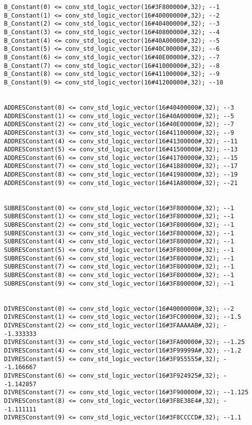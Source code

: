\documentclass[conference]{IEEEtran}
\begin{document}
\begin{lstlisting}
B_Constant(0) <= conv_std_logic_vector(16#3F800000#,32); --1
B_Constant(1) <= conv_std_logic_vector(16#40000000#,32); --2
B_Constant(2) <= conv_std_logic_vector(16#40400000#,32); --3
B_Constant(3) <= conv_std_logic_vector(16#40800000#,32); --4
B_Constant(4) <= conv_std_logic_vector(16#40A00000#,32); --5
B_Constant(5) <= conv_std_logic_vector(16#40C00000#,32); --6
B_Constant(6) <= conv_std_logic_vector(16#40E00000#,32); --7
B_Constant(7) <= conv_std_logic_vector(16#41000000#,32); --8
B_Constant(8) <= conv_std_logic_vector(16#41100000#,32); --9
B_Constant(9) <= conv_std_logic_vector(16#41200000#,32); --10


ADDRESConstant(0) <= conv_std_logic_vector(16#40400000#,32); --3
ADDRESConstant(1) <= conv_std_logic_vector(16#40A00000#,32); --5
ADDRESConstant(2) <= conv_std_logic_vector(16#40E00000#,32); --7
ADDRESConstant(3) <= conv_std_logic_vector(16#41100000#,32); --9
ADDRESConstant(4) <= conv_std_logic_vector(16#41300000#,32); --11
ADDRESConstant(5) <= conv_std_logic_vector(16#41500000#,32); --13
ADDRESConstant(6) <= conv_std_logic_vector(16#41700000#,32); --15
ADDRESConstant(7) <= conv_std_logic_vector(16#41880000#,32); --17
ADDRESConstant(8) <= conv_std_logic_vector(16#41980000#,32); --19
ADDRESConstant(9) <= conv_std_logic_vector(16#41A80000#,32); --21


SUBRESConstant(0) <= conv_std_logic_vector(16#3F800000#,32); --1
SUBRESConstant(1) <= conv_std_logic_vector(16#3F800000#,32); --1
SUBRESConstant(2) <= conv_std_logic_vector(16#3F800000#,32); --1
SUBRESConstant(3) <= conv_std_logic_vector(16#3F800000#,32); --1
SUBRESConstant(4) <= conv_std_logic_vector(16#3F800000#,32); --1
SUBRESConstant(5) <= conv_std_logic_vector(16#3F800000#,32); --1
SUBRESConstant(6) <= conv_std_logic_vector(16#3F800000#,32); --1
SUBRESConstant(7) <= conv_std_logic_vector(16#3F800000#,32); --1
SUBRESConstant(8) <= conv_std_logic_vector(16#3F800000#,32); --1
SUBRESConstant(9) <= conv_std_logic_vector(16#3F800000#,32); --1


DIVRESConstant(0) <= conv_std_logic_vector(16#40000000#,32); --2
DIVRESConstant(1) <= conv_std_logic_vector(16#3FC00000#,32); --1.5
DIVRESConstant(2) <= conv_std_logic_vector(16#3FAAAAAB#,32); --1.333333
DIVRESConstant(3) <= conv_std_logic_vector(16#3FA00000#,32); --1.25
DIVRESConstant(4) <= conv_std_logic_vector(16#3F99999A#,32); --1.2
DIVRESConstant(5) <= conv_std_logic_vector(16#3F955555#,32); --1.166667
DIVRESConstant(6) <= conv_std_logic_vector(16#3F924925#,32); --1.142857
DIVRESConstant(7) <= conv_std_logic_vector(16#3F900000#,32); --1.125
DIVRESConstant(8) <= conv_std_logic_vector(16#3F8E38E4#,32); --1.111111
DIVRESConstant(9) <= conv_std_logic_vector(16#3F8CCCCD#,32); --1.1



\end{lstlisting}
\end{document}
